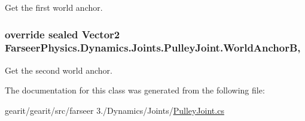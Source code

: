 Get the first world anchor. 

\hypertarget{class_farseer_physics_1_1_dynamics_1_1_joints_1_1_pulley_joint_a32814d563ad29e17e1d517a223467d4d}{
\subsubsection[{World\+Anchor\+B}]{\setlength{\rightskip}{0pt plus 5cm}override sealed Vector2 Farseer\+Physics.\+Dynamics.\+Joints.\+Pulley\+Joint.\+World\+Anchor\+B\hspace{0.3cm}{\ttfamily [get]}, {\ttfamily [set]}}}\label{class_farseer_physics_1_1_dynamics_1_1_joints_1_1_pulley_joint_a32814d563ad29e17e1d517a223467d4d}


Get the second world anchor. 



The documentation for this class was generated from the following file\+:\begin{DoxyCompactItemize}
\item 
gearit/gearit/src/farseer 3./\+Dynamics/\+Joints/\hyperlink{_pulley_joint_8cs}{Pulley\+Joint.\+cs}\end{DoxyCompactItemize}
